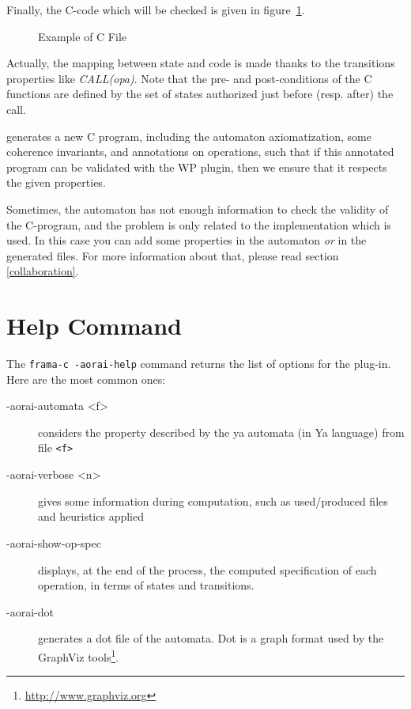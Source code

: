 \documentclass{frama-c-book}
\begin{document}
Finally, the C-code which will be checked is given in
figure~\ref{example_c_file}.

\begin{figure}[htb]

\caption{Example of C File}
\label{example_c_file}
\end{figure}

Actually, the mapping between state and code is made thanks to the
transitions properties like \emph{CALL(opa)}. Note that
the pre- and post-conditions of the C functions are defined by the set
of states authorized just before (resp. after) the call.

\aorai generates a new C program, including the automaton
axiomatization, some coherence invariants, and annotations on
operations, such that if this annotated program can be validated with
the WP plugin, then we ensure that it respects the given
properties.

Sometimes, the automaton has not enough information to check the
validity of the C-program, and the problem is only related to the
implementation which is used. In this case you can add some properties
in the automaton \emph{or} in the generated files. For more
information about that, please read section \ref{collaboration}.

\section{Help Command}\label{sec:help-command}

 The \texttt{frama-c -aorai-help} command returns the list of options for the
 \aorai plug-in. Here are the most common ones:
 \begin{description}
   \item[-aorai-automata <f>] considers the property described by the ya
     automata (in Ya language) from file \texttt{<f>}
   \item[-aorai-verbose <n>] gives some information during computation,
     such as used/produced files and heuristics applied
   \item[-aorai-show-op-spec] displays, at the end of the process, the computed specification of each operation, in terms of states and transitions.
   \item[-aorai-dot] generates a dot file of the automata.
     Dot is a graph format used by the
     GraphViz tools\footnote{\url{http://www.graphviz.org}}.

 \end{description}
\end{document}
